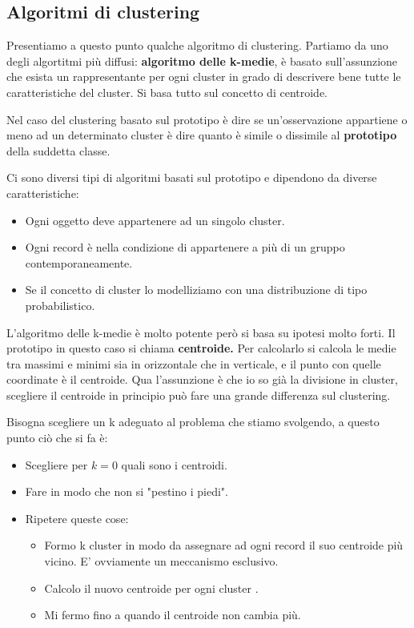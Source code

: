 \documentclass[12pt, a4paper,titlepage,openany]{article}
\begin{document}
\subsection{Algoritmi di clustering}

Presentiamo a questo punto qualche algoritmo di clustering. Partiamo da uno degli algortitmi più diffusi: \textbf{algoritmo delle k-medie}, è basato sull'assunzione che esista un rappresentante per ogni cluster in grado di descrivere bene tutte le caratteristiche del cluster. Si basa tutto sul concetto di centroide.

Nel caso del clustering basato sul prototipo è dire se un'osservazione appartiene o meno ad un determinato cluster è dire quanto è simile o dissimile al \textbf{prototipo} della suddetta classe.

Ci sono diversi tipi di algoritmi basati sul prototipo e dipendono da diverse caratteristiche:
\begin{itemize}
	\item Ogni oggetto deve appartenere ad un singolo cluster.
	\item Ogni record è nella condizione di appartenere a più di un gruppo contemporaneamente.
	\item Se il concetto di cluster lo modelliziamo con una distribuzione di tipo probabilistico.
\end{itemize}

L'algoritmo delle k-medie è molto potente però si basa su ipotesi molto forti. Il prototipo in questo caso si chiama \textbf{centroide.} Per calcolarlo si calcola le medie tra massimi e minimi sia in orizzontale che in verticale, e il punto con quelle coordinate è il centroide. Qua l'assunzione è che io so già la divisione in cluster, scegliere il centroide in principio può fare una grande differenza sul clustering.

Bisogna scegliere un k adeguato al problema che stiamo svolgendo, a questo punto ciò che si fa è:

\begin{itemize}
	\item Scegliere per $k = 0$ quali sono i centroidi.
	\item Fare in modo che non si "pestino i piedi".
	\item Ripetere queste cose:
	\begin{itemize}
		\item Formo k cluster in modo da assegnare ad ogni record il suo centroide più vicino. E' ovviamente un meccanismo esclusivo.
		\item Calcolo il nuovo centroide per ogni cluster .
		\item Mi fermo fino a quando il centroide non cambia più.		 
	\end{itemize}


\end{itemize}
\end{document}
